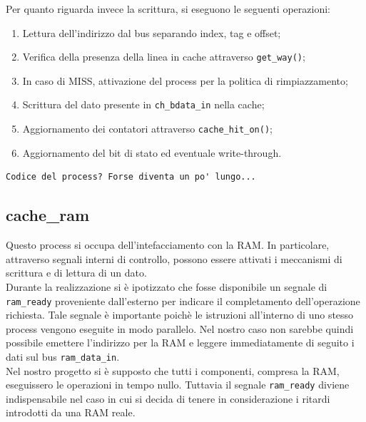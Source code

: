 Per quanto riguarda invece la scrittura, si eseguono le seguenti operazioni:
\begin{enumerate}
  \item Lettura dell'indirizzo dal bus separando index, tag e offset; 
  \item Verifica della presenza della linea in cache attraverso \texttt{get\_way()};
  \item In caso di MISS, attivazione del process per la politica di rimpiazzamento;
  \item Scrittura del dato presente in \texttt{ch\_bdata\_in} nella cache;
  \item Aggiornamento dei contatori attraverso \texttt{cache\_hit\_on()};
  \item Aggiornamento del bit di stato ed eventuale write-through.
\end{enumerate}



\begin{lstlisting}
Codice del process? Forse diventa un po' lungo...
\end{lstlisting}


\subsection{cache\_ram}

Questo process si occupa dell'intefacciamento con la RAM. In particolare, attraverso segnali interni di controllo, possono essere attivati i meccanismi di scrittura e di lettura di un dato.\\

Durante la realizzazione si \`e ipotizzato che fosse disponibile un segnale di \texttt{ram\_ready} proveniente dall'esterno per indicare il completamento dell'operazione richiesta. Tale segnale \`e importante poich\`e le istruzioni all'interno di uno stesso process vengono eseguite in modo parallelo. Nel nostro caso non sarebbe quindi possibile emettere l'indirizzo per la RAM e leggere immediatamente di seguito i dati sul bus \texttt{ram\_data\_in}.\\

Nel nostro progetto si \`e supposto che tutti i componenti, compresa la RAM, eseguissero le operazioni in tempo nullo. Tuttavia il segnale \texttt{ram\_ready} diviene indispensabile nel caso in cui si decida di tenere in considerazione i ritardi introdotti da una RAM reale.


